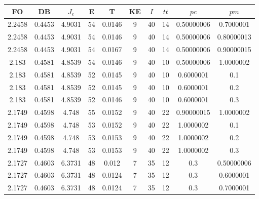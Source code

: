\begin{table}[h!]
    \footnotesize
    \begin{center}
        \begin{tabular}{|c|c|c|c|c|c|c|c|c|c|}
        \hline
            {\bf FO} & {\bf DB} & $J_e$ & {\bf E} & {\bf T} & {\bf KE} & $I$ & $tt$ & $pc$ & $pm$ \\
        \hline
        \hline
            2.2458 & 0.4453  & 4.9031 & 54 & 0.0146 & 9 & 40 & 14 & 0.50000006 & 0.7000001\\
        \hline
        \hline
            2.2458 & 0.4453  & 4.9031 & 54 & 0.0146 & 9 & 40 & 14 & 0.50000006 & 0.80000013\\
        \hline
        \hline
            2.2458 & 0.4453  & 4.9031 & 54 & 0.0167 & 9 & 40 & 14 & 0.50000006 & 0.90000015\\
        \hline
        \hline
            2.183 & 0.4581  & 4.8539 & 54 & 0.0146 & 9 & 40 & 10 & 0.50000006 & 1.0000002\\
        \hline
        \hline
            2.183 & 0.4581  & 4.8539 & 52 & 0.0145 & 9 & 40 & 10 & 0.6000001 & 0.1\\
        \hline
        \hline
            2.183 & 0.4581  & 4.8539 & 52 & 0.0145 & 9 & 40 & 10 & 0.6000001 & 0.2\\
        \hline
        \hline
            2.183 & 0.4581  & 4.8539 & 52 & 0.0146 & 9 & 40 & 10 & 0.6000001 & 0.3\\
        \hline
        \hline
            2.1749 & 0.4598  & 4.748 & 55 & 0.0152 & 9 & 40 & 22 & 0.90000015 & 1.0000002\\
        \hline
        \hline
            2.1749 & 0.4598  & 4.748 & 53 & 0.0152 & 9 & 40 & 22 & 1.0000002 & 0.1\\
        \hline
        \hline
            2.1749 & 0.4598  & 4.748 & 53 & 0.0153 & 9 & 40 & 22 & 1.0000002 & 0.2\\
        \hline
        \hline
            2.1749 & 0.4598  & 4.748 & 53 & 0.0153 & 9 & 40 & 22 & 1.0000002 & 0.3\\
        \hline
        \hline
            2.1727 & 0.4603  & 6.3731 & 48 & 0.012 & 7 & 35 & 12 & 0.3 & 0.50000006\\
        \hline
        \hline
            2.1727 & 0.4603  & 6.3731 & 48 & 0.0124 & 7 & 35 & 12 & 0.3 & 0.6000001\\
        \hline
        \hline
            2.1727 & 0.4603  & 6.3731 & 48 & 0.0124 & 7 & 35 & 12 & 0.3 & 0.7000001\\
        \hline

\end{tabular}
\end{center}
\end{table}

